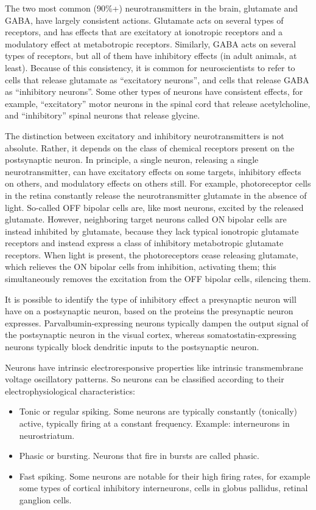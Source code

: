 The two most common (90\%+) neurotransmitters in the brain, glutamate and GABA, have largely consistent actions. Glutamate acts on several types of receptors, and has effects that are excitatory at ionotropic receptors and a modulatory effect at metabotropic receptors. Similarly, GABA acts on several types of receptors, but all of them have inhibitory effects (in adult animals, at least). Because of this consistency, it is common for neuroscientists to refer to cells that release glutamate as ``excitatory neurons'', and cells that release GABA as ``inhibitory neurons''. Some other types of neurons have consistent effects, for example, ``excitatory'' motor neurons in the spinal cord that release acetylcholine, and ``inhibitory'' spinal neurons that release glycine.

The distinction between excitatory and inhibitory neurotransmitters is not absolute. Rather, it depends on the class of chemical receptors present on the postsynaptic neuron. In principle, a single neuron, releasing a single neurotransmitter, can have excitatory effects on some targets, inhibitory effects on others, and modulatory effects on others still. For example, photoreceptor cells in the retina constantly release the neurotransmitter glutamate in the absence of light. So-called OFF bipolar cells are, like most neurons, excited by the released glutamate. However, neighboring target neurons called ON bipolar cells are instead inhibited by glutamate, because they lack typical ionotropic glutamate receptors and instead express a class of inhibitory metabotropic glutamate receptors. When light is present, the photoreceptors cease releasing glutamate, which relieves the ON bipolar cells from inhibition, activating them; this simultaneously removes the excitation from the OFF bipolar cells, silencing them.

It is possible to identify the type of inhibitory effect a presynaptic neuron will have on a postsynaptic neuron, based on the proteins the presynaptic neuron expresses. Parvalbumin-expressing neurons typically dampen the output signal of the postsynaptic neuron in the visual cortex, whereas somatostatin-expressing neurons typically block dendritic inputs to the postsynaptic neuron.

Neurons have intrinsic electroresponsive properties like intrinsic transmembrane voltage oscillatory patterns. So neurons can be classified according to their electrophysiological characteristics:

\begin{itemize}
\tightlist
\item
  Tonic or regular spiking. Some neurons are typically constantly (tonically) active, typically firing at a constant frequency. Example: interneurons in neurostriatum.
\item
  Phasic or bursting. Neurons that fire in bursts are called phasic.
\item
  Fast spiking. Some neurons are notable for their high firing rates, for example some types of cortical inhibitory interneurons, cells in globus pallidus, retinal ganglion cells.
\end{itemize}

